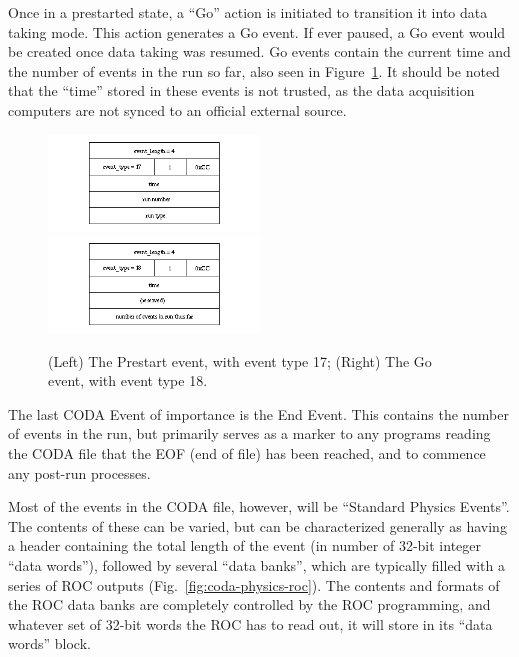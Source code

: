 Once in a prestarted state, a ``Go'' action is initiated to transition it into data taking mode. This action generates a Go event. If ever paused, a Go event would be created once data taking was resumed. Go events contain the current time and the number of events in the run so far, also seen in Figure~\ref{fig:coda-prestart-go}. It should be noted that the ``time'' stored in these events is not trusted, as the data acquisition computers are not synced to an official external source.

\begin{figure}
	\centerline{
		\mbox{\includegraphics[width=0.5\textwidth]{figures/production/prestart_event.png} \includegraphics[width=0.5\textwidth]{figures/production/go_event.png}}
	}
	\caption{(Left) The Prestart event, with event type 17; (Right) The Go event, with event type 18\cite{jlab:coda}.}
	\label{fig:coda-prestart-go}
\end{figure}

The last CODA Event of importance is the End Event. This contains the number of events in the run, but primarily serves as a marker to any programs reading the CODA file that the EOF (end of file) has been reached, and to commence any post-run processes.

Most of the events in the CODA file, however, will be ``Standard Physics Events''. The contents of these can be varied, but can be characterized generally as having a header containing the total length of the event (in number of 32-bit integer ``data words''), followed by several ``data banks'', which are typically filled with a series of ROC outputs (Fig.~\ref{fig:coda-physics-roc}). The contents and formats of the ROC data banks are completely controlled by the ROC programming, and whatever set of 32-bit words the ROC has to read out, it will store in its ``data words'' block. 

